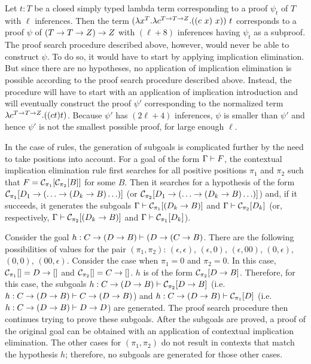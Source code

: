 \documentclass{llncs}
\begin{document}
\begin{example}
\label{ex:NonOptimalProofSearch}
Let $t: T$ be a closed simply typed lambda term corresponding to a proof $\psi_t$ of $T$ with $\ell$ inferences. Then the term 
$(\lambda x^T. \lambda c^{T \rightarrow T \rightarrow Z}. ((c~x)~x))~t$ corresponds to a proof $\psi$ of $(T \rightarrow T \rightarrow Z) \rightarrow Z$ with $(\ell + 8)$ inferences having $\psi_t$ as a subproof. The proof search procedure described above, however, would never be able to construct $\psi$. To do so, it would have to start by applying implication elimination. But since there are no hypotheses, no application of implication elimination is possible according to the proof search procedure described above. Instead, the procedure will have to start with an application of implication introduction and will eventually construct the proof $\psi'$ corresponding to the normalized term $\lambda c^{T \rightarrow T \rightarrow Z}. ((c t) t)$. Because $\psi'$ has $(2 \ell + 4)$ inferences, $\psi$ is smaller than $\psi'$ and hence $\psi'$ is not the smallest possible proof, for large enough $\ell$. 
\end{example}


In the case of {\NDd} rules, the generation of subgoals is complicated further by the need to take positions into account. For a goal of the form $\Gamma \vdash F$, the contextual implication elimination rule first searches for all positive positions $\pi_1$ and $\pi_2$ such that $F = \mathcal{C}_{\pi_1}[\mathcal{C}_{\pi_2}[B]]$ for some $B$. Then it searches for a hypothesis of the form $\mathcal{C}_{\pi_1}[D_1 \rightarrow (\ldots \rightarrow (D_k \rightarrow B)\ldots)]$ (or $\mathcal{C}_{\pi_2}[D_1 \rightarrow (\ldots \rightarrow (D_k \rightarrow B)\ldots)]$) and, if it succeeds, it generates the subgoals $\Gamma \vdash \mathcal{C}_{\pi_1}[(D_k \rightarrow B)]$ and $\Gamma \vdash \mathcal{C}_{\pi_2}[D_k]$ (or, respectively, $\Gamma \vdash \mathcal{C}_{\pi_2}[(D_k \rightarrow B)]$ and $\Gamma \vdash \mathcal{C}_{\pi_1}[D_k]$).

\begin{example}
Consider the goal $h: C \rightarrow (D \rightarrow B) \vdash (D \rightarrow (C \rightarrow B)$. There are the following possibilities of values for the pair $(\pi_1,\pi_2)$: $(\epsilon,\epsilon)$, $(\epsilon,0)$, $(\epsilon,00)$, $(0,\epsilon)$, $(0,0)$, $(00,\epsilon)$. Consider the case when $\pi_1 = 0$ and $\pi_2 = 0$. In this case, $\mathcal{C}_{\pi_1}[] = D \rightarrow []$ and $\mathcal{C}_{\pi_2}[] = C \rightarrow []$. $h$ is of the form $\mathcal{C}_{\pi_2}[D\rightarrow B]$. Therefore, for this case, the subgoals $h: C \rightarrow (D \rightarrow B) \vdash \mathcal{C}_{\pi_2}[D\rightarrow B]$ (i.e. $h: C \rightarrow (D \rightarrow B) \vdash C \rightarrow (D \rightarrow B)$) and $h: C \rightarrow (D \rightarrow B) \vdash \mathcal{C}_{\pi_1}[D]$ (i.e. $h: C \rightarrow (D \rightarrow B) \vdash D \rightarrow D$) are generated. The proof search procedure then continues trying to prove these subgoals. After the subgoals are proved, a proof of the original goal can be obtained with an application of contextual implication elimination. The other cases for $(\pi_1,\pi_2)$ do not result in contexts that match the hypothesis $h$; therefore, no subgoals are generated for those other cases.
\end{example}
\end{document}
